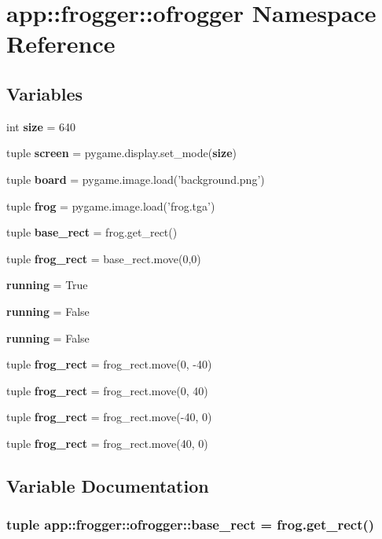 \section{app::frogger::ofrogger Namespace Reference}
\label{namespaceapp_1_1frogger_1_1ofrogger}


\subsection*{Variables}
\begin{CompactItemize}
\item 
int {\bf size} = 640
\item 
tuple {\bf screen} = pygame.display.set\_\-mode({\bf size})
\item 
tuple {\bf board} = pygame.image.load('background.png')
\item 
tuple {\bf frog} = pygame.image.load('frog.tga')
\item 
tuple {\bf base\_\-rect} = frog.get\_\-rect()
\item 
tuple {\bf frog\_\-rect} = base\_\-rect.move(0,0)
\item 
{\bf running} = True
\item 
{\bf running} = False
\item 
{\bf running} = False
\item 
tuple {\bf frog\_\-rect} = frog\_\-rect.move(0, -40)
\item 
tuple {\bf frog\_\-rect} = frog\_\-rect.move(0, 40)
\item 
tuple {\bf frog\_\-rect} = frog\_\-rect.move(-40, 0)
\item 
tuple {\bf frog\_\-rect} = frog\_\-rect.move(40, 0)
\end{CompactItemize}


\subsection{Variable Documentation}
\subsubsection{\setlength{\rightskip}{0pt plus 5cm}tuple {\bf app::frogger::ofrogger::base\_\-rect} = frog.get\_\-rect()\hspace{0.3cm}{\tt  [static]}}\label{namespaceapp_1_1frogger_1_1ofrogger_1646be0a3cd68f8e653f19575790c76c}





